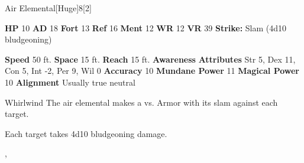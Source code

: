   \begin{monsubsection}{Air Elemental}[Huge]{8}[2]
    \vspace{-1em}\vspace{-1em}
    \vspace{0em}

    
    

    \begin{spellcontent}
      \begin{spelltargetinginfo}
        \pari \textbf{HP} 10 \monsep
          \textbf{AD} 18 \monsep
          \textbf{Fort} 13 \monsep
          \textbf{Ref} 16 \monsep
          \textbf{Ment} 12
        \pari \textbf{WR} 12 \monsep
        \textbf{VR} 39
        \pari \textbf{Strike:}
            Slam  (4d10 bludgeoning)
      \end{spelltargetinginfo}
    \end{spellcontent}
    \begin{monsterfooter}
      \pari \textbf{Speed} 50 ft. \monsep
        \textbf{Space} 15 ft. \monsep
        \textbf{Reach} 15 ft.
      \pari \textbf{Awareness} 
      \pari \textbf{Attributes}
        Str 5, Dex 11,
        Con 5, Int -2,
        Per 9, Wil 0
      \pari \textbf{Accuracy} 10 \monsep
        \textbf{Mundane Power} 11 \monsep
      \textbf{Magical Power} 10
      \pari \textbf{Alignment} Usually true neutral
    \end{monsterfooter}
  \end{monsubsection}
  \begin{freeability}{Whirlwind}
       The air elemental makes a 
         vs. Armor
        with its slam against each target.
    
    \hit Each target takes 4d10 bludgeoning damage.
    \end{freeability}
  ,
